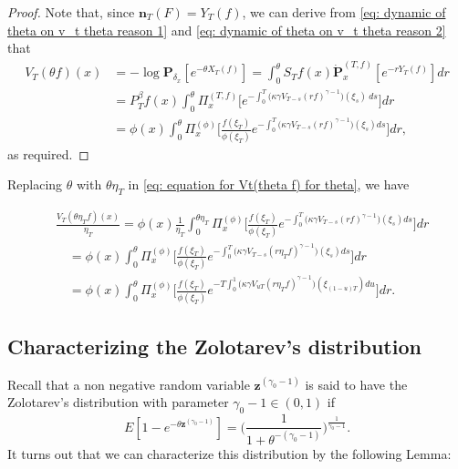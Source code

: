 \documentclass[12pt, a4paper]{amsart}
\theoremstyle{definition}
\numberwithin{equation}{section}
\begin{document}
\begin{proof}
	Note that, since $\mathbf n_T(F)= Y_T(f)$, we can derive from \eqref{eq: dynamic of theta on v_t theta reason 1} and \eqref{eq: dynamic of theta on v_t theta reason 2} that
\[\begin{split}
	V_T(\theta f)(x)
	&= -\log \mathbf P_{\delta_x}[e^{-\theta X_T(f)}]
	= \int_0^\theta S_Tf(x) \dot {\mathbf P}_x^{(T,f)}[e^{-r  Y_T(f)}] dr
	\\&=P^\beta_Tf(x)\int_0^\theta \Pi_x^{(T,f)} \big[e^{-\int_0^T \big(\kappa\gamma V_{T-s}(r f)^{\gamma-1}\big)(\xi_s)~ds}\big] dr
	\\&= \phi( x) \int_0^\theta \Pi_x^{(\phi)} \Big[ \frac{ f(\xi_T) } { \phi(\xi_T) } e^{ - \int_0^T \big( \kappa \gamma V_{T-s} (r f)^{ \gamma - 1} \big) ( \xi_s) ds} \Big] dr,
\end{split}\]
as required.
\end{proof}

	Replacing $\theta$ with $\theta \eta_T$ in \eqref{eq: equation for Vt(theta f) for theta}, we have

\[\label{eq: equation for normalized V_T}\begin{split}
	&\frac{V_T(\theta \eta_T f)(x)}{\eta_T}
	= \phi(x) \frac{1}{\eta_T}\int_0^{\theta \eta_T} \Pi_x^{(\phi)} \Big[ \frac { f(\xi_T) } { \phi(\xi_T) } e^{-\int_0^T \big(\kappa\gamma V_{T-s}(r f)^{\gamma-1}\big)(\xi_s) ds}\Big] dr
	\\&\quad = \phi(x) \int_0^{\theta} \Pi_x^{(\phi)} \Big[ \frac { f(\xi_T) } { \phi(\xi_T) }  e^{-\int_0^T \big(\kappa\gamma V_{T-s}(r \eta_T f)^{\gamma-1}\big)(\xi_s) ds}\Big] dr
	\\&\quad = \phi(x)\int_0^{\theta} \Pi_x^{(\phi)} \Big[\frac{f(\xi_T)}{\phi(\xi_T)} e^{-T\int_0^1 \big(\kappa\gamma V_{uT}(r \eta_T f)^{\gamma-1}\big)(\xi_{(1-u)T}) du}\Big] dr.
\end{split}\]

\subsection{Characterizing the Zolotarev's distribution}
\label{sec: Characterizing the Zolotarev's distribution using an non-linear delay equation}

	Recall that a non negative random variable $\mathbf z^{(\gamma_0 - 1)}$ is said to have the Zolotarev's distribution with parameter $\gamma_0 - 1 \in (0,1)$ if
\[
	E[1-e^{-\theta\mathbf z^{(\gamma_0 - 1)}}] 
	=\Big( \frac{1}{1+\theta^{-(\gamma_0 - 1)}} \Big)^{\frac{1}{\gamma_0 - 1}}.
\]
	It turns out that we can characterize this distribution by the following Lemma:
\end{document}
